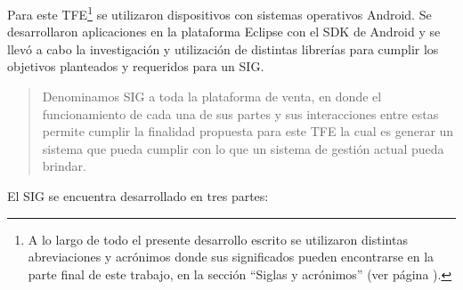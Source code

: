 Para este \ac{TFE}\footnote{A lo largo de todo el presente desarrollo escrito se utilizaron distintas abreviaciones y acr\'onimos donde sus significados pueden encontrarse en la parte final de este trabajo, en la secci\'on ``Siglas y acr\'onimos'' (ver p\'agina \pageref{sec:acronimos}).} se utilizaron dispositivos con sistemas operativos Android\Si{\texttrademark}. Se desarrollaron aplicaciones en la plataforma Eclipse\Si{\texttrademark} con el \ac{SDK} de Android\Si{\texttrademark} y se llev\'o a cabo la investigaci\'on y utilizaci\'on de distintas librer\'ias para cumplir los objetivos planteados y requeridos para un \ac{SIG}.

\begin{quote}
Denominamos \ac{SIG} a toda la plataforma de venta, en donde el funcionamiento de cada una de sus partes y sus interacciones entre estas permite cumplir la finalidad propuesta para este \ac{TFE} la cual es generar un sistema que pueda cumplir con lo que un sistema de gesti\'on actual pueda brindar.
\end{quote}

El \ac{SIG} se encuentra desarrollado en tres partes:

